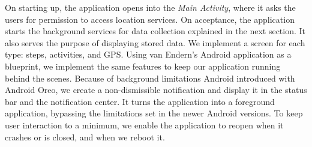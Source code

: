 On starting up, the application opens into the \textit{Main Activity}, where it asks the users for permission to access location services. On acceptance, the application starts the background services for data collection explained in the next section. It also serves the purpose of displaying stored data. We implement a screen for each type: steps, activities, and GPS. Using van Endern's Android application as a blueprint, we implement the same features to keep our application running behind the scenes. Because of background limitations Android introduced with Android Oreo, we create a non-dismissible notification and display it in the status bar and the notification center. It turns the application into a foreground application, bypassing the limitations set in the newer Android versions. To keep user interaction to a minimum, we enable the application to reopen when it crashes or is closed, and when we reboot it.

